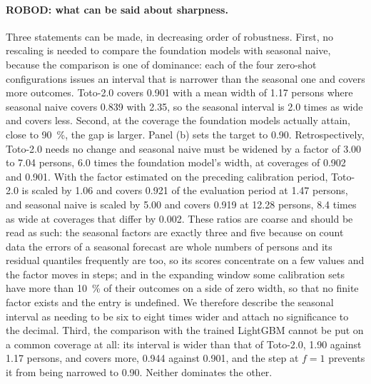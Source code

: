 \documentclass[utf8]{FrontiersinHarvard}
\newif\ifsecondrevisionmarkup
\newcommand{\rev}[1]{\ifsecondrevisionmarkup\textcolor{revisiontwo}{#1}\else#1\fi}
\theoremstyle{plain}
\theoremstyle{definition}
\theoremstyle{remark}
\begin{document}
\rev{\paragraph{ROBOD: what can be said about sharpness.} Three statements can be made, in decreasing order of robustness. First, no rescaling is needed to compare the foundation models with seasonal naive, because the comparison is one of dominance: each of the four zero-shot configurations issues an interval that is narrower than the seasonal one and covers more outcomes. Toto-2.0 covers \num{0.901} with a mean width of \num{1.17} persons where seasonal naive covers \num{0.839} with \num{2.35}, so the seasonal interval is \num{2.0} times as wide and covers less. Second, at the coverage the foundation models actually attain, close to \SI{90}{\percent}, the gap is larger. Panel (b) sets the target to \num{0.90}. Retrospectively, Toto-2.0 needs no change and seasonal naive must be widened by a factor of \num{3.00} to \num{7.04} persons, \num{6.0} times the foundation model's width, at coverages of \num{0.902} and \num{0.901}. With the factor estimated on the preceding calibration period, Toto-2.0 is scaled by \num{1.06} and covers \num{0.921} of the evaluation period at \num{1.47} persons, and seasonal naive is scaled by \num{5.00} and covers \num{0.919} at \num{12.28} persons, \num{8.4} times as wide at coverages that differ by \num{0.002}. These ratios are coarse and should be read as such: the seasonal factors are exactly three and five because on count data the errors of a seasonal forecast are whole numbers of persons and its residual quantiles frequently are too, so its scores concentrate on a few values and the factor moves in steps; and in the expanding window some calibration sets have more than \SI{10}{\percent} of their outcomes on a side of zero width, so that no finite factor exists and the entry is undefined. We therefore describe the seasonal interval as needing to be six to eight times wider and attach no significance to the decimal. Third, the comparison with the trained LightGBM cannot be put on a common coverage at all: its interval is wider than that of Toto-2.0, \num{1.90} against \num{1.17} persons, and covers more, \num{0.944} against \num{0.901}, and the step at $f=1$ prevents it from being narrowed to \num{0.90}. Neither dominates the other.}
\end{document}
